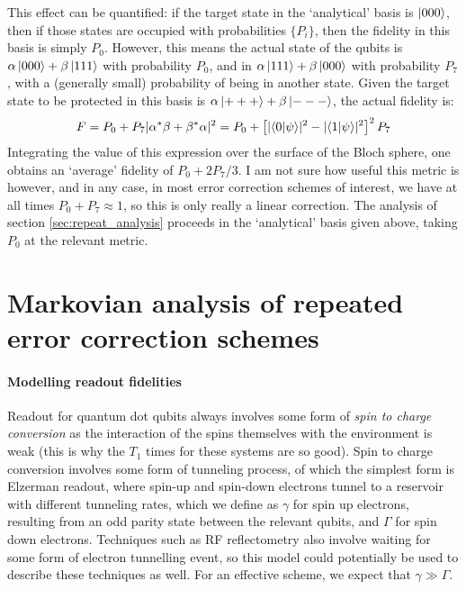 \documentclass{report}
\begin{document}
\begin{appendices}
This effect can be quantified: if the target state in the `analytical' basis is $\ket{000}$, then if those states are occupied with probabilities $\{P_i\}$, then the fidelity in this basis is simply $P_0$. However, this means the actual state of the qubits is $\alpha \ket{000} + \beta \ket{111}$ with probability $P_0$, and in $\alpha \ket{111} + \beta \ket{000}$ with probability $P_7$, with a (generally small) probability of being in another state. Given the target state to be protected in this basis is $\alpha \ket{+++} + \beta \ket{---}$, the actual fidelity is:
\begin{align*}
    F = P_0 + P_7|\alpha^* \beta + \beta^* \alpha|^2 = P_0 + \left[\lvert\braket{0|\psi}\rvert^2 - \lvert\braket{1|\psi}\rvert^2\right]^2P_7
\end{align*}
Integrating the value of this expression over the surface of the Bloch sphere, one obtains an `average' fidelity of $P_0 + 2P_7/3$. I am not sure how useful this metric is however, and in any case, in most error correction schemes of interest, we have at all times $P_0 + P_7 \approx 1$, so this is only really a linear correction. The analysis of section \ref{sec:repeat_analysis} proceeds in the `analytical' basis given above, taking $P_0$ at the relevant metric.

\chapter{Markovian analysis of repeated error correction schemes}\label{appendix:markovanalysis}
\subsubsection{Modelling readout fidelities}
Readout for quantum dot qubits always involves some form of \textit{spin to charge conversion} as the interaction of the spins themselves with the environment is weak (this is why the $T_1$ times for these systems are so good). Spin to charge conversion involves some form of tunneling process, of which the simplest form is Elzerman readout, where spin-up and spin-down electrons tunnel to a reservoir with different tunneling rates, which we define as $\gamma$ for spin up electrons, resulting from an odd parity state between the relevant qubits, and $\Gamma$ for spin down electrons. Techniques such as RF reflectometry also involve waiting for some form of electron tunnelling event, so this model could potentially be used to describe these techniques as well. For an effective scheme, we expect that $\gamma \gg \Gamma$.


\end{appendices}
\end{document}
